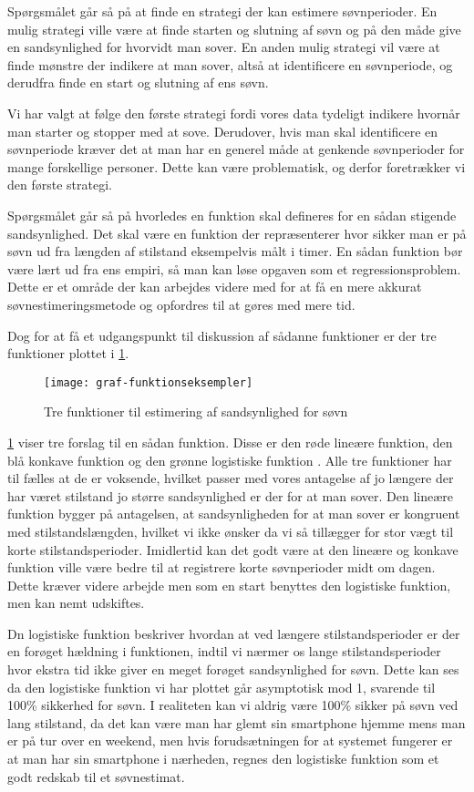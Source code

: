 Spørgsmålet går så på at finde en strategi der kan estimere søvnperioder. 
En mulig strategi ville være at finde starten og slutning af søvn og på den måde give en sandsynlighed for hvorvidt man sover.
En anden mulig strategi vil være at finde mønstre der indikere at man sover, altså at identificere en søvnperiode, og derudfra finde en start og slutning af ens søvn.

Vi har valgt at følge den første strategi fordi vores data tydeligt indikere hvornår man starter og stopper med at sove. 
Derudover, hvis man skal identificere en søvnperiode kræver det at man har en generel måde at genkende søvnperioder for mange forskellige personer.
Dette kan være problematisk, og derfor foretrækker vi den første strategi.

Spørgsmålet går så på hvorledes en funktion skal defineres for en sådan stigende sandsynlighed.
Det skal være en funktion der repræsenterer hvor sikker man er på søvn ud fra længden af stilstand eksempelvis målt i timer.
En sådan funktion bør være lært ud fra ens empiri, så man kan løse opgaven som et regressionsproblem.
Dette er et område der kan arbejdes videre med for at få en mere akkurat søvnestimeringsmetode og opfordres til at gøres med mere tid.

Dog for at få et udgangspunkt til diskussion af sådanne funktioner er der tre funktioner plottet i \cref{fig:trefunc}.
\begin{figure}[h]
	\centering
	\texttt{[image: graf-funktionseksempler]}
	\caption{Tre funktioner til estimering af sandsynlighed for søvn}\label{fig:trefunc}
\end{figure}

\cref{fig:trefunc} viser tre forslag til en sådan funktion.
Disse er den røde lineære funktion, den blå konkave funktion og den grønne logistiske funktion \citep{wiki:LogisticFunction}.
Alle tre funktioner har til fælles at de er voksende, hvilket passer med vores antagelse af jo længere der har været stilstand jo større sandsynlighed er der for at man sover.
Den lineære funktion bygger på antagelsen, at sandsynligheden for at man sover er kongruent med stilstandslængden, hvilket vi ikke ønsker da vi så tillægger for stor vægt til korte stilstandsperioder. Imidlertid kan det godt være at den lineære og konkave funktion ville være bedre til at registrere korte søvnperioder midt om dagen.
Dette kræver videre arbejde men som en start benyttes den logistiske funktion, men kan nemt udskiftes.


Dn logistiske funktion beskriver hvordan at ved længere stilstandsperioder er der en forøget hældning i funktionen, indtil vi nærmer os lange stilstandsperioder hvor ekstra tid ikke giver en meget forøget sandsynlighed for søvn. 
Dette kan ses da den logistiske funktion vi har plottet går asymptotisk mod 1, svarende til 100\% sikkerhed for søvn.
I realiteten kan vi aldrig være 100\% sikker på søvn ved lang stilstand, da det kan være man har glemt sin smartphone hjemme mens man er på tur over en weekend, men hvis forudsætningen for at systemet fungerer er at man har sin smartphone i nærheden, regnes den logistiske funktion som et godt redskab til et søvnestimat.

